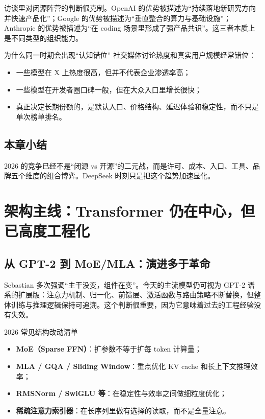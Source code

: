 \documentclass[a4paper]{article}
\begin{document}
访谈里对闭源阵营的判断很克制。OpenAI 的优势被描述为“持续落地新研究方向并快速产品化”；Google 的优势被描述为“垂直整合的算力与基础设施”；Anthropic 的优势被描述为“在 coding 场景里形成了强产品共识”。这三者本质上是不同类型的组织能力。

\begin{knowledgebox}{为什么同一时期会出现“认知错位”}
社交媒体讨论热度和真实用户规模经常错位：
\begin{itemize}[leftmargin=1.5em]
    \item 一些模型在 X 上热度很高，但并不代表企业渗透率高；
    \item 一些模型在开发者圈口碑一般，但在大众入口里增长很快；
    \item 真正决定长期份额的，是默认入口、价格结构、延迟体验和稳定性，而不只是单次榜单排名。
\end{itemize}
\end{knowledgebox}

\subsection{本章小结}

2026 的竞争已经不是“闭源 vs 开源”的二元战，而是许可、成本、入口、工具、品牌五个维度的组合博弈。DeepSeek 时刻只是把这个趋势加速显化。

\section{架构主线：Transformer 仍在中心，但已高度工程化}

\subsection{从 GPT-2 到 MoE/MLA：演进多于革命}

Sebastian 多次强调“主干没变，组件在变”。今天的主流模型仍可视为 GPT-2 谱系的扩展版：注意力机制、归一化、前馈层、激活函数与路由策略不断替换，但整体训练与推理逻辑保持可追溯。这个判断很重要，因为它意味着过去的工程经验没有失效。

\begin{importantbox}{2026 常见结构改动清单}
\begin{itemize}[leftmargin=1.5em]
    \item \textbf{MoE（Sparse FFN）}：扩参数不等于扩每 token 计算量；
    \item \textbf{MLA / GQA / Sliding Window}：重点优化 KV cache 和长上下文推理效率；
    \item \textbf{RMSNorm / SwiGLU 等}：在稳定性与效率之间做细粒度优化；
    \item \textbf{稀疏注意力索引器}：在长序列里做有选择的读取，而不是全量注意。
\end{itemize}
\end{importantbox}
\end{document}
